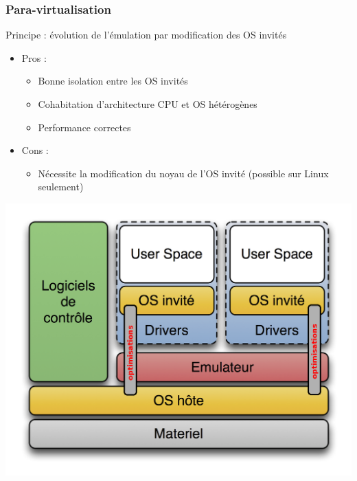   \begin{frame}
    \frametitle{Para-virtualisation}
    Principe : évolution de l'émulation par modification des OS invités
    \begin{itemize}
      \item Pros :
      \begin{itemize}
        \item Bonne isolation entre les OS invités
        \item Cohabitation d'architecture CPU et OS hétérogènes
        \item Performance correctes
      \end{itemize}
      \item Cons :
      \begin{itemize}
        \item Nécessite la modification du noyau de l'OS invité (possible sur Linux seulement)
      \end{itemize}
    \end{itemize}
    \begin{center}
      \includegraphics[width=0.5\linewidth]{images/Diagramme_ArchiEmulateur-para.png}
    \end{center}
  \end{frame}
  
